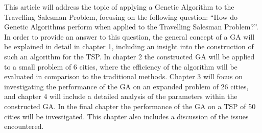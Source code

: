 \vspace{5mm}
\par
This article will address the topic of applying a Genetic Algorithm to the Travelling Salesman Problem, focusing on the following question: “How do Genetic Algorithms perform when applied to the Travelling Salesman Problem?”. In order to provide an answer to this question, the general concept of a GA will be explained in detail in chapter 1, including an insight into the construction of such an algorithm for the TSP. In chapter 2 the constructed GA will be applied to a small problem of 6 cities, where the efficiency of the algorithm will be evaluated in comparison to the traditional methods. Chapter 3 will focus on investigating the performance of the GA on an expanded problem of 26 cities, and chapter 4 will include a detailed analysis of the parameters within the constructed GA. In the final chapter the performance of the GA on a TSP of 50 cities will be investigated. This chapter also includes a discussion of the issues encountered.

\vspace{5mm}


